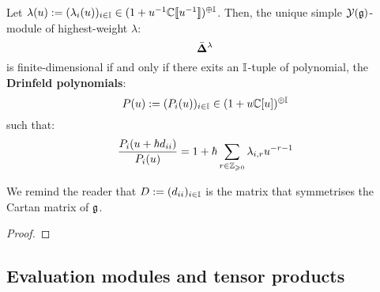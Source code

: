         \begin{theorem} \label{theorem: classification_of_finite_dimensional_simple_modules_of_finite_untwisted_yangians}
            Let $\lambda(u) := ( \lambda_i(u) )_{i \in \mathbb{I}} \in (1 + u^{-1}\mathbb{C}[\![u^{-1}]\!])^{\oplus \mathbb{I}}$. Then, the unique simple $\mathcal{Y}(\mathfrak{g})$-module of highest-weight $\lambda$:
                $$\bar{ \mathbf{ \Delta } }^{\lambda}$$
            is finite-dimensional if and only if there exits an $\mathbb{I}$-tuple of polynomial, the \textbf{Drinfeld polynomials}:
                $$P(u) := ( P_i(u) )_{i \in \mathbb{I}} \in (1 + u\mathbb{C}[u])^{\oplus \mathbb{I}}$$
            such that:
                $$\frac{P_i(u + \hbar d_{ii})}{P_i(u)} = 1 + \hbar \sum_{r \in \mathbb{Z}_{\geqslant 0}} \lambda_{i, r} u^{-r - 1}$$
        \end{theorem}
        We remind the reader that $D := (d_{ii})_{i \in \mathbb{I}}$ is the matrix that symmetrises the Cartan matrix of $\mathfrak{g}$.
            \begin{proof}
                
            \end{proof}
        \begin{definition} \label{def: dominant_integral_weights_yangians}
            
        \end{definition}

    \subsection{Evaluation modules and tensor products}